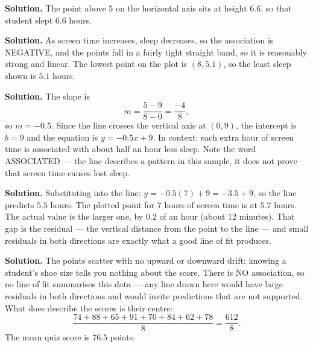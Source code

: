 \documentclass[12pt]{article}
\begin{document}


\textbf{Solution.} The point above $5$ on the horizontal axis sits at height $6.6$, so that student slept $6.6$ hours.



\textbf{Solution.} As screen time increases, sleep decreases, so the association is NEGATIVE, and the points fall in a fairly tight straight band, so it is reasonably strong and linear. The lowest point on the plot is $(8, 5.1)$, so the least sleep shown is $5.1$ hours.



\textbf{Solution.} The slope is
\[
m=\frac{5-9}{8-0}=\frac{-4}{8},
\]
so $m = -0.5$. Since the line crosses the vertical axis at $(0, 9)$, the intercept is $b = 9$ and the equation is $y = -0.5x + 9$. In context: each extra hour of screen time is associated with about half an hour less sleep. Note the word ASSOCIATED --- the line describes a pattern in this sample, it does not prove that screen time causes lost sleep.



\textbf{Solution.} Substituting into the line: $y = -0.5(7) + 9 = -3.5 + 9$, so the line predicts $5.5$ hours. The plotted point for $7$ hours of screen time is at $5.7$ hours. The actual value is the larger one, by $0.2$ of an hour (about $12$ minutes). That gap is the residual --- the vertical distance from the point to the line --- and small residuals in both directions are exactly what a good line of fit produces.



\textbf{Solution.} The points scatter with no upward or downward drift: knowing a student's shoe size tells you nothing about the score. There is NO association, so no line of fit summarises this data --- any line drawn here would have large residuals in both directions and would invite predictions that are not supported. What does describe the scores is their centre:
\[
\frac{74+88+65+91+70+84+62+78}{8}=\frac{612}{8}.
\]
The mean quiz score is $76.5$ points.
\end{document}

